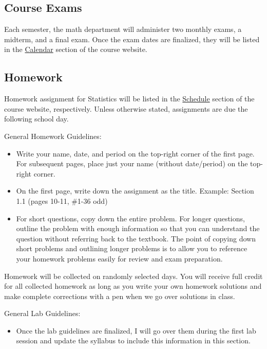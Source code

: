\documentclass[12pt,fleqn]{article}
\providecommand{\tightlist}{%
  \setlength{\itemsep}{0pt}\setlength{\parskip}{0pt}}
\begin{document}
\hypertarget{course-exams}{%
\subsection{Course Exams}\label{course-exams}}

Each semester, the math department will administer two monthly exams, a midterm, and a final exam. Once the exam dates are finalized, they will be listed in the \href{https://ap-statistics.github.io/calendar/2019-2020.html}{Calendar} section of the course website.

\hypertarget{homework}{%
\subsection{Homework}\label{homework}}

Homework assignment for Statistics will be listed in the \href{https://ap-calculus.github.io/schedule}{Schedule} section of the course website, respectively. Unless otherwise stated, assignments are due the following school day.

General Homework Guidelines:

\begin{itemize}
\item
  Write your name, date, and period on the top-right corner of the first page. For subsequent pages, place just your name (without date/period) on the top-right corner.
\item
  On the first page, write down the assignment as the title. Example: Section 1.1 (pages 10-11, \#1-36 odd)
\item
  For short questions, copy down the entire problem. For longer questions, outline the problem with enough information so that you can understand the question without referring back to the textbook. The point of copying down short problems and outlining longer problems is to allow you to reference your homework problems easily for review and exam preparation.
\end{itemize}

Homework will be collected on randomly selected days. You will receive full credit for all collected homework as long as you write your own homework solutions and make complete corrections with a pen when we go over solutions in class.

General Lab Guidelines:

\begin{itemize}
\tightlist
\item
  Once the lab guidelines are finalized, I will go over them during the first lab session and update the syllabus to include this information in this section.
\end{itemize}
\end{document}
